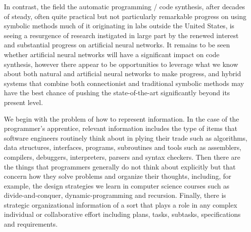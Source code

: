 In contrast, the field the automatic programming / code synthesis, after decades of steady, often quite practical but not particularly remarkable progress on using symbolic methods \emdash{} much of it originating in labs outside the United States, is seeing a resurgence of research instigated in large part by the renewed interest and substantial progress on artificial neural networks. It remains to be seen whether artificial neural networks will have a significant impact on code synthesis, however there appear to be opportunities to leverage what we know about both natural and artificial neural networks to make progress, and hybrid systems that combine both connectionist and traditional symbolic methods may have the best chance of pushing the state-of-the-art significantly beyond its present level.






We begin with the problem of how to represent information. In the case of the programmer's apprentice, relevant information includes the type of items that software engineers routinely think about in plying their trade such as algorithms, data structures, interfaces, programs, subroutines and tools such as assemblers, compilers, debuggers, interpreters, parsers and syntax checkers. Then there are the things that programmers generally do not think about explicitly but that concern how they solve problems and organize their thoughts, including, for example, the design strategies we learn in computer science courses such as divide-and-conquer, dynamic-programming and recursion. Finally, there is strategic organizational information of a sort that plays a role in any complex individual or collaborative effort including plans, tasks, subtasks, specifications and requirements.

